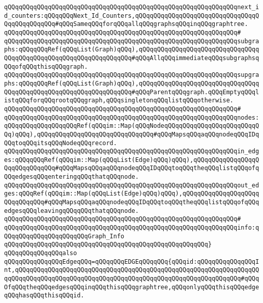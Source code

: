 \verb|qQQqqQQqqQQqqQQqqQQqqQQqqQQqqQQqqQQqqQQqqQQqqQQqqQQqqQQqqQQqqQQqnext_id_counters:qQQqqQQqNext_Id_Counters,qQQqqQQqqQQqqQQqqQQqqQQqqQQqqQQqqQQqqQQqqQQqqQQq#qQQqSameqQQqforqQQqallqQQqgraphsqQQqinqQQqgraphtree.|\newline
\verb|qQQqqQQqqQQqqQQqqQQqqQQqqQQqqQQqqQQqqQQqqQQqqQQqqQQqqQQqqQQqqQQq#|\newline
\verb|qQQqqQQqqQQqqQQqqQQqqQQqqQQqqQQqqQQqqQQqqQQqqQQqqQQqqQQqqQQqqQQqsubgraphs:qQQqqQQqRef(qQQqList(Graph)qQQq),qQQqqQQqqQQqqQQqqQQqqQQqqQQqqQQqqQQqqQQqqQQqqQQqqQQqqQQqqQQqqQQqqQQq#qQQqAllqQQqimmediateqQQqsubgraphsqQQqofqQQqthisqQQqgraph.|\newline
\verb|qQQqqQQqqQQqqQQqqQQqqQQqqQQqqQQqqQQqqQQqqQQqqQQqqQQqqQQqqQQqqQQqsupgraphs:qQQqqQQqRef(qQQqList(Graph)qQQq),qQQqqQQqqQQqqQQqqQQqqQQqqQQqqQQqqQQqqQQqqQQqqQQqqQQqqQQqqQQqqQQqqQQq#qQQqParentqQQqgraph.qQQqEmptyqQQqlistqQQqforqQQqrootqQQqgraph,qQQqsingletonqQQqlistqQQqotherwise.|\newline
\verb|qQQqqQQqqQQqqQQqqQQqqQQqqQQqqQQqqQQqqQQqqQQqqQQqqQQqqQQqqQQqqQQq#|\newline
\verb|qQQqqQQqqQQqqQQqqQQqqQQqqQQqqQQqqQQqqQQqqQQqqQQqqQQqqQQqqQQqqQQqnodes:qQQqqQQqqQQqqQQqqQQqRef(qQQqim::Map(qQQqNodeqQQqqQQqqQQqqQQqqQQqqQQqqQQq)qQQq),qQQqqQQqqQQqqQQqqQQqqQQqqQQqqQQq#qQQqMapsqQQqaqQQqnodeqQQqIDqQQqtoqQQqitsqQQqNodeqQQqrecord.|\newline
\verb|qQQqqQQqqQQqqQQqqQQqqQQqqQQqqQQqqQQqqQQqqQQqqQQqqQQqqQQqqQQqqQQqin_edges:qQQqqQQqRef(qQQqim::Map(qQQqList(Edge)qQQq)qQQq),qQQqqQQqqQQqqQQqqQQqqQQqqQQqqQQq#qQQqMapsqQQqaqQQqnodeqQQqIDqQQqtoqQQqtheqQQqlistqQQqofqQQqedgesqQQqenteringqQQqthatqQQqnode.|\newline
\verb|qQQqqQQqqQQqqQQqqQQqqQQqqQQqqQQqqQQqqQQqqQQqqQQqqQQqqQQqqQQqqQQqout_edges:qQQqRef(qQQqim::Map(qQQqList(Edge)qQQq)qQQq),qQQqqQQqqQQqqQQqqQQqqQQqqQQqqQQq#qQQqMapsqQQqaqQQqnodeqQQqIDqQQqtoqQQqtheqQQqlistqQQqofqQQqedgesqQQqleavingqQQqqQQqthatqQQqnode.|\newline
\verb|qQQqqQQqqQQqqQQqqQQqqQQqqQQqqQQqqQQqqQQqqQQqqQQqqQQqqQQqqQQqqQQq#|\newline
\verb|qQQqqQQqqQQqqQQqqQQqqQQqqQQqqQQqqQQqqQQqqQQqqQQqqQQqqQQqqQQqqQQqinfo:qQQqqQQqqQQqqQQqqQQqqQQqGraph_Info|\newline
\verb|qQQqqQQqqQQqqQQqqQQqqQQqqQQqqQQqqQQqqQQqqQQqqQQqqQQqqQQq}|\newline
\newline
\verb|qQQqqQQqqQQqqQQqalso|\newline
\verb|qQQqqQQqqQQqqQQqEdgeqQQq=qQQqqQQqEDGEqQQqqQQq{qQQqid:qQQqqQQqqQQqqQQqInt,qQQqqQQqqQQqqQQqqQQqqQQqqQQqqQQqqQQqqQQqqQQqqQQqqQQqqQQqqQQqqQQqqQQqqQQqqQQqqQQqqQQqqQQqqQQqqQQqqQQqqQQqqQQqqQQqqQQqqQQqqQQqqQQqqQQq#qQQqOfqQQqtheqQQqedgesqQQqinqQQqthisqQQqgraphtree,qQQqonlyqQQqthisqQQqedgeqQQqhasqQQqthisqQQqid.|\newline
